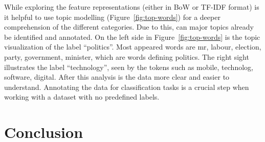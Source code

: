 While exploring the feature representations (either in BoW or TF-IDF format) is it helpful to use topic modelling (Figure~\ref{fig:top-words}) for a deeper comprehension of the different categories. Due to this, can major topics already be identified and annotated. On the left side in Figure~\ref{fig:top-words} is the topic visualization of the label “politics”. Most appeared words are mr, labour, election, party, government, minister, which are words defining politics. The right sight illustrates the label “technology”, seen by the tokens such as mobile, technolog, software, digital. After this analysis is the data more clear and easier to understand. Annotating the data for classification tasks is a crucial step when working with a dataset with no predefined labels.

\section{Conclusion}


